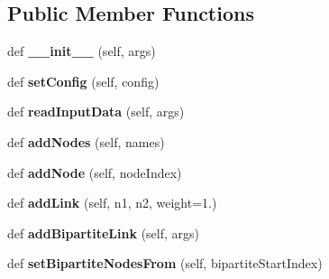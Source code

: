 \subsection*{Public Member Functions}
\begin{DoxyCompactItemize}
\item 
\mbox{\label{classinfomapfolder_1_1infomap_1_1Network_ae720e37cb677a9ed76c762cc57804665}} 
def {\bfseries \+\_\+\+\_\+init\+\_\+\+\_\+} (self, args)
\item 
\mbox{\label{classinfomapfolder_1_1infomap_1_1Network_a522e2c81a3493fe9d5f342e6d9052586}} 
def {\bfseries set\+Config} (self, config)
\item 
\mbox{\label{classinfomapfolder_1_1infomap_1_1Network_a03be104a0d96773b40ee4afc2a8e0ceb}} 
def {\bfseries read\+Input\+Data} (self, args)
\item 
\mbox{\label{classinfomapfolder_1_1infomap_1_1Network_a196463371725da56d94ebe5af9dde6a0}} 
def {\bfseries add\+Nodes} (self, names)
\item 
\mbox{\label{classinfomapfolder_1_1infomap_1_1Network_a39e7a5e8ce9ccdb404e9d5fbc5d4ff3a}} 
def {\bfseries add\+Node} (self, node\+Index)
\item 
\mbox{\label{classinfomapfolder_1_1infomap_1_1Network_a1dfaae225e074bf850aa1893e68c2f0d}} 
def {\bfseries add\+Link} (self, n1, n2, weight=1.)
\item 
\mbox{\label{classinfomapfolder_1_1infomap_1_1Network_a6782e027d1d4ba32e8f52234ed5d2bf1}} 
def {\bfseries add\+Bipartite\+Link} (self, args)
\item 
\mbox{\label{classinfomapfolder_1_1infomap_1_1Network_af12d27c2030404db88611c29fd404d99}} 
def {\bfseries set\+Bipartite\+Nodes\+From} (self, bipartite\+Start\+Index)
\item 
\mbox{\label{classinfomapfolder_1_1infomap_1_1Network_a15df8f5b826ee4e68e6eef5502d8c8a4}} 

\end{DoxyCompactItemize}
